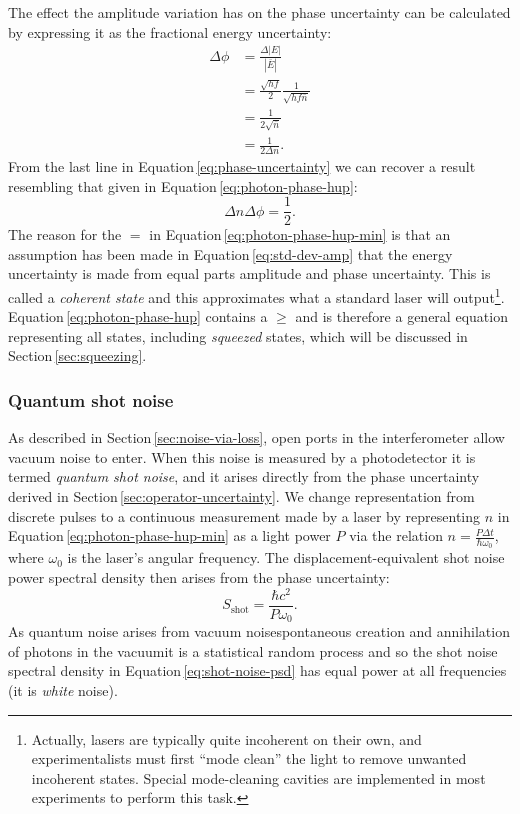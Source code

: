 The effect the amplitude variation has on the phase uncertainty can be calculated by expressing it as the fractional energy uncertainty:
\begin{equation}
  \label{eq:phase-uncertainty}
  \begin{split}
    \Delta \phi &= \frac{\Delta \left| E \right|}{\left| \bar{E} \right|} \\
                &= \frac{\sqrt{hf}}{2} \frac{1}{\sqrt{hf \bar{n}}} \\
                &= \frac{1}{2 \sqrt{\bar{n}}} \\
                &= \frac{1}{2 \Delta n}.
  \end{split}
\end{equation}
From the last line in Equation\,\ref{eq:phase-uncertainty} we can recover a result resembling that given in Equation\,\ref{eq:photon-phase-hup}:
\begin{equation}
  \label{eq:photon-phase-hup-min}
  \Delta n \Delta \phi = \frac{1}{2}.
\end{equation}
The reason for the $=$ in Equation\,\ref{eq:photon-phase-hup-min} is that an assumption has been made in Equation\,\ref{eq:std-dev-amp} that the energy uncertainty is made from equal parts amplitude and phase uncertainty. This is called a \emph{coherent state} and this approximates what a standard laser will output\footnote{Actually, lasers are typically quite incoherent on their own, and experimentalists must first ``mode clean'' the light to remove unwanted incoherent states. Special mode-cleaning cavities are implemented in most experiments to perform this task.}. Equation\,\ref{eq:photon-phase-hup} contains a $\geq$ and is therefore a general equation representing all states, including \emph{squeezed} states, which will be discussed in Section\,\ref{sec:squeezing}.

\subsubsection{Quantum shot noise}
As described in Section\,\ref{sec:noise-via-loss}, open ports in the interferometer allow vacuum noise to enter. When this noise is measured by a photodetector it is termed \emph{quantum shot noise}, and it arises directly from the phase uncertainty derived in Section\,\ref{sec:operator-uncertainty}. We change representation from discrete pulses to a continuous measurement made by a laser by representing $n$ in Equation\,\ref{eq:photon-phase-hup-min} as a light power $P$ via the relation $n = \frac{P \Delta t}{\hbar \omega_0}$, where $\omega_0$ is the laser's angular frequency. The displacement-equivalent shot noise power spectral density then arises from the phase uncertainty:
\begin{equation}
  \label{eq:shot-noise-psd}
  S_{\text{shot}} = \frac{\hbar c^2}{P \omega_0}.
\end{equation}
As quantum noise arises from vacuum noise\textemdash spontaneous creation and annihilation of photons in the vacuum\textemdash it is a statistical random process and so the shot noise spectral density in Equation\,\ref{eq:shot-noise-psd} has equal power at all frequencies (it is \emph{white} noise).

